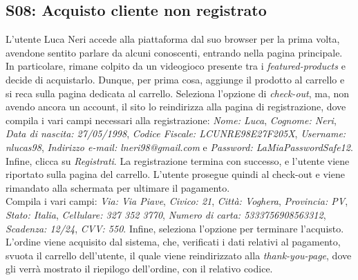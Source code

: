 \documentclass[12pt, a4paper, oneside]{book}
\begin{document}
    \subsection*{S08: Acquisto cliente non registrato}
         L'utente Luca Neri accede alla piattaforma dal suo browser per la prima volta, avendone sentito parlare da alcuni conoscenti, entrando nella pagina principale.
         In particolare, rimane colpito da un videogioco presente tra i \textit{featured-products} e decide di acquistarlo. Dunque, per prima cosa, aggiunge il prodotto
         al carrello e si reca sulla pagina dedicata al carrello. Seleziona l'opzione di \textit{check-out}, ma, non avendo ancora un account, il sito lo reindirizza alla pagina
         di registrazione, dove compila i vari campi necessari alla registrazione: \textit{Nome: Luca}, \textit{Cognome: Neri}, \textit{Data di nascita: 27/05/1998},
         \textit{Codice Fiscale: LCUNRE98E27F205X}, \textit{Username: nlucas98}, \textit{Indirizzo e-mail: lneri98@gmail.com} e \textit{Password: LaMiaPasswordSafe12}. Infine, clicca
         su \textit{Registrati}. La registrazione termina con successo, e l'utente viene riportato sulla pagina del carrello. L'utente prosegue quindi al check-out e viene rimandato
         alla schermata per ultimare il pagamento.\\
         Compila i vari campi: \textit{Via: Via Piave}, \textit{Civico: 21}, \textit{Città: Voghera}, \textit{Provincia: PV}, \textit{Stato: Italia}, \textit{Cellulare: 327 352 3770},
         \textit{Numero di carta: 5333756908563312}, \textit{Scadenza: 12/24}, \textit{CVV: 550}. Infine, seleziona l'opzione per terminare l'acquisto.\\
         L'ordine viene acquisito dal sistema, che, verificati i dati relativi al pagamento, svuota il carrello dell'utente, il quale viene reindirizzato alla \textit{thank-you-page},
         dove gli verrà mostrato il riepilogo dell'ordine, con il relativo codice.
\end{document}
